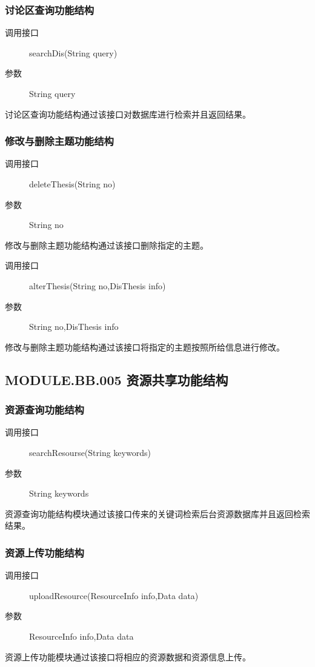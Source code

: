   \subsubsection{讨论区查询功能结构}
  \begin{description}
    \item[调用接口]searchDis(String query)
    \item[参数]String query
  \end{description}
  讨论区查询功能结构通过该接口对数据库进行检索并且返回结果。
  \subsubsection{修改与删除主题功能结构}
  \begin{description}
    \item[调用接口]deleteThesis(String no)
    \item[参数]String no
  \end{description}
  修改与删除主题功能结构通过该接口删除指定的主题。
  \begin{description}
    \item[调用接口]alterThesis(String no,DisThesis info)
    \item[参数]String no,DisThesis info
  \end{description}
  修改与删除主题功能结构通过该接口将指定的主题按照所给信息进行修改。

\subsection{MODULE.BB.005 资源共享功能结构}
  \subsubsection{资源查询功能结构}
  \begin{description}
    \item[调用接口]searchResourse(String keywords)
    \item[参数]String keywords
  \end{description}
  资源查询功能结构模块通过该接口传来的关键词检索后台资源数据库并且返回检索结果。
  \subsubsection{资源上传功能结构}
  \begin{description}
    \item[调用接口]uploadResource(ResourceInfo info,Data data)
    \item[参数]ResourceInfo info,Data data
  \end{description}
  资源上传功能模块通过该接口将相应的资源数据和资源信息上传。
